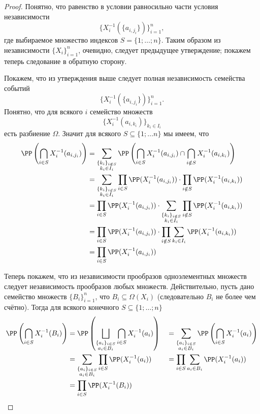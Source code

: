 \documentclass[12pt,a4paper]{article}
\begin{document}
    \begin{proof}
        Понятно, что равенство в условии равносильно части условия независимости
        \[\{X_i^{-1}(\{a_{i, j_i}\})\}_{i=1}^n,\]
        где выбираемое множество индексов $S = \{1; \dots; n\}$. Таким образом из независимости $\{X_i\}_{i=1}^n$, очевидно, следует предыдущее утверждение; покажем теперь следование в обратную сторону.

        Покажем, что из утверждения выше следует полная независимость семейства событий
        \[\{X_i^{-1}(\{a_{i, j_i}\})\}_{i=1}^n.\]
        Понятно, что для всякого $i$ семейство множеств
        \[\{X_i^{-1}(a_{i, k_i})\}_{k_i \in I_i}\]
        есть разбиение $\Omega$. Значит для всякого $S \subseteq \{1; \dots n\}$ мы имеем, что
        \begin{align*}
            \PP\left(\bigcap_{i \in S} X_i^{-1}(a_{i, j_i})\right)
            &= \sum_{\substack{\{k_i\}_{i \notin S}\\ k_i \in I_i}} \PP\left(\bigcap_{i \in S} X_i^{-1}(a_{i, j_i}) \cap \bigcap_{i \notin S} X_i^{-1}(a_{i, k_i})\right)\\
            &= \sum_{\substack{\{k_i\}_{i \notin S}\\ k_i \in I_i}} \prod_{i \in S} \PP(X_i^{-1}(a_{i, j_i})) \cdot \prod_{i \notin S} \PP(X_i^{-1}(a_{i, k_i}))\\
            &= \prod_{i \in S} \PP(X_i^{-1}(a_{i, j_i})) \cdot \sum_{\substack{\{k_i\}_{i \notin S}\\ k_i \in I_i}} \prod_{i \notin S} \PP(X_i^{-1}(a_{i, k_i}))\\
            &= \prod_{i \in S} \PP(X_i^{-1}(a_{i, j_i})) \cdot \prod_{i \notin S} \sum_{k_i \in I_i} \PP(X_i^{-1}(a_{i, k_i}))\\
            &= \prod_{i \in S} \PP(X_i^{-1}(a_{i, j_i}))
        \end{align*}

        Теперь покажем, что из независимости прообразов одноэлементных множеств следует независимость прообразов любых множеств. Действительно, пусть дано семейство множеств $\{B_i\}_{i = 1}^n$, что $B_i \subseteq \Omega(X_i)$ (следовательно $B_i$ не более чем счётно). Тогда для всякого конечного $S \subseteq \{1; \dots; n\}$
        \begin{align*}
            \PP\left(\bigcap_{i \in S} X_i^{-1}(B_i)\right)
            &= \PP\left(\bigsqcup_{\substack{\{a_i\}_{i \in S}\\ a_i \in B_i}} \bigcap_{i \in S} X_i^{-1}(a_i)\right)&
            &= \sum_{\substack{\{a_i\}_{i \in S}\\ a_i \in B_i}} \PP\left(\bigcap_{i \in S} X_i^{-1}(a_i)\right)\\
            &= \sum_{\substack{\{a_i\}_{i \in S}\\ a_i \in B_i}} \prod_{i \in S} \PP(X_i^{-1}(a_i))&
            &= \prod_{i \in S} \sum_{a_i \in B_i} \PP(X_i^{-1}(a_i))\\
            &= \prod_{i \in S} \PP(X_i^{-1}(B_i))
        \end{align*}
    \end{proof}
\end{document}
